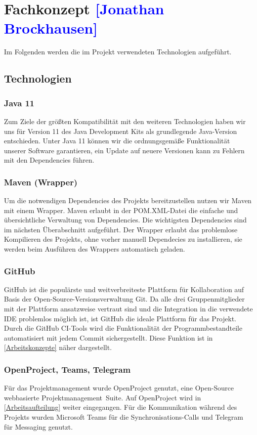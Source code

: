 

\section{Fachkonzept \textcolor{blue}{[Jonathan Brockhausen]}}
\label{Technologien}

Im Folgenden werden die im Projekt verwendeten Technologien aufgeführt.

\subsection{Technologien}

\subsubsection*{Java 11}
Zum Ziele der größten Kompatibilität mit den weiteren Technologien haben wir uns für Version 11 des Java Development Kits als grundlegende Java-Version entschieden. Unter Java 11 können wir die ordnungsgemäße Funktionalität unserer Software garantieren, ein Update auf neuere Versionen kann zu Fehlern mit den Dependencies führen.
\subsubsection*{Maven (Wrapper)}
Um die notwendigen Dependencies des Projekts bereitzustellen nutzen wir Maven mit einem Wrapper. Maven erlaubt in der POM.XML-Datei die einfache und übersichtliche Verwaltung von Dependencies. Die wichtigsten Dependencies sind im nächsten Überabschnitt aufgeführt. Der Wrapper erlaubt das problemlose Kompilieren des Projekts, ohne vorher manuell Dependecies zu installieren, sie werden beim Ausführen des Wrappers automatisch geladen.
\subsubsection*{GitHub}
GitHub ist die populärste und weitverbreiteste Plattform für Kollaboration auf Basis der Open-Source-Versionsverwaltung Git. Da alle drei Gruppenmitglieder mit der Plattform ansatzweise vertraut sind und die Integration in die verwendete IDE problemlos möglich ist, ist GitHub die ideale Plattform für das Projekt. Durch die GitHub CI-Tools wird die Funktionalität der Programmbestandteile automatisiert mit jedem Commit sichergestellt. Diese Funktion ist in \cref{Arbeitskonzepte} näher dargestellt.
\subsubsection*{OpenProject, Teams, Telegram}
Für das Projektmanagement wurde OpenProject genutzt, eine Open-Source webbasierte Projektmanagement~Suite. Auf OpenProject wird in \autoref{Arbeitsaufteilung} weiter eingegangen.
Für die Kommunikation während des Projekts wurden Microsoft Teams für die Synchronisations-Calls und Telegram für Messaging genutzt.

